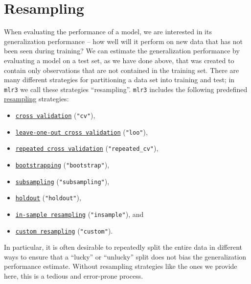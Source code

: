 \documentclass[
]{scrbook}
\providecommand{\tightlist}{%
  \setlength{\itemsep}{0pt}\setlength{\parskip}{0pt}}
\begin{document}
\hypertarget{resampling}{%
\section{Resampling}\label{resampling}}

When evaluating the performance of a model, we are interested in its generalization performance -- how well will it perform on new data that has not been seen during training?
We can estimate the generalization performance by evaluating a model on a test set, as we have done above, that was created to contain only observations that are not contained in the training set.
There are many different strategies for partitioning a data set into training and test; in \texttt{mlr3} we call these strategies ``resampling''.
\texttt{mlr3} includes the following predefined \protect\hyperlink{resampling}{resampling} strategies:

\begin{itemize}
\tightlist
\item
  \href{https://mlr3.mlr-org.com/reference/mlr_resamplings_cv.html}{\texttt{cross\ validation}} (\texttt{"cv"}),
\item
  \href{https://mlr3.mlr-org.com/reference/mlr_resamplings_loo.html}{\texttt{leave-one-out\ cross\ validation}} (\texttt{"loo"}),
\item
  \href{https://mlr3.mlr-org.com/reference/mlr_resamplings_repeated_cv.html}{\texttt{repeated\ cross\ validation}} (\texttt{"repeated\_cv"}),
\item
  \href{https://mlr3.mlr-org.com/reference/mlr_resamplings_bootstrap.html}{\texttt{bootstrapping}} (\texttt{"bootstrap"}),
\item
  \href{https://mlr3.mlr-org.com/reference/mlr_resamplings_subsampling.html}{\texttt{subsampling}} (\texttt{"subsampling"}),
\item
  \href{https://mlr3.mlr-org.com/reference/mlr_resamplings_holdout.html}{\texttt{holdout}} (\texttt{"holdout"}),
\item
  \href{https://mlr3.mlr-org.com/reference/mlr_resamplings_insample.html}{\texttt{in-sample\ resampling}} (\texttt{"insample"}), and
\item
  \href{https://mlr3.mlr-org.com/reference/mlr_resamplings_custom.html}{\texttt{custom\ resampling}} (\texttt{"custom"}).
\end{itemize}

In particular, it is often desirable to repeatedly split the entire data in different ways to ensure that a ``lucky'' or ``unlucky'' split does not bias the generalization performance estimate.
Without resampling strategies like the ones we provide here, this is a tedious and error-prone process.
\end{document}
